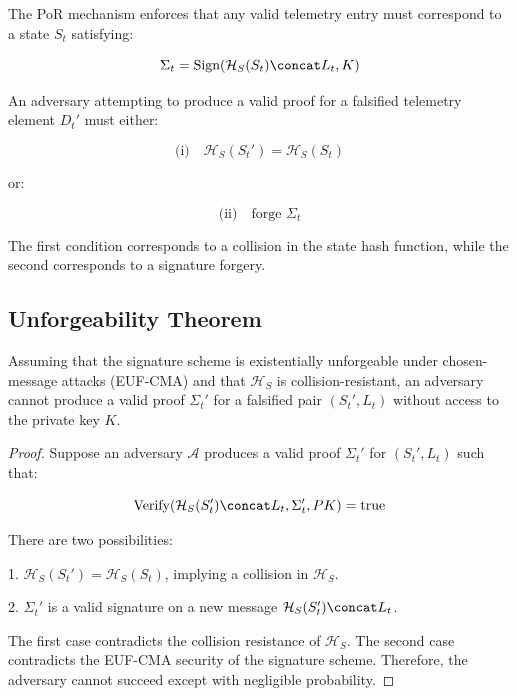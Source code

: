 The PoR mechanism enforces that any valid telemetry entry must correspond to a state $S_t$ satisfying:

\begin{equation}
\Sigma_t = \text{Sign}(\mathcal{H}_S(S_t) \concat L_t, K)
\end{equation}

An adversary attempting to produce a valid proof for a falsified telemetry element $D_t'$ must either:

\begin{equation}
\text{(i)} \quad \mathcal{H}_S(S_t') = \mathcal{H}_S(S_t)
\end{equation}

or:

\begin{equation}
\text{(ii)} \quad \text{forge } \Sigma_t
\end{equation}

The first condition corresponds to a collision in the state hash function, while the second corresponds to a signature forgery.

\subsection{Unforgeability Theorem}

\begin{theorem}
Assuming that the signature scheme is existentially unforgeable under chosen-message attacks (EUF-CMA) and that $\mathcal{H}_S$ is collision-resistant, an adversary cannot produce a valid proof $\Sigma_t'$ for a falsified pair $(S_t', L_t)$ without access to the private key $K$.
\end{theorem}

\begin{proof}
Suppose an adversary $\mathcal{A}$ produces a valid proof $\Sigma_t'$ for $(S_t', L_t)$ such that:

\[
\text{Verify}(\mathcal{H}_S(S_t') \concat L_t, \Sigma_t', PK) = \text{true}
\]

There are two possibilities:

1. $\mathcal{H}_S(S_t') = \mathcal{H}_S(S_t)$, implying a collision in $\mathcal{H}_S$.

2. $\Sigma_t'$ is a valid signature on a new message $\mathcal{H}_S(S_t') \concat L_t$.

The first case contradicts the collision resistance of $\mathcal{H}_S$. The second case contradicts the EUF-CMA security of the signature scheme. Therefore, the adversary cannot succeed except with negligible probability.
\end{proof}

